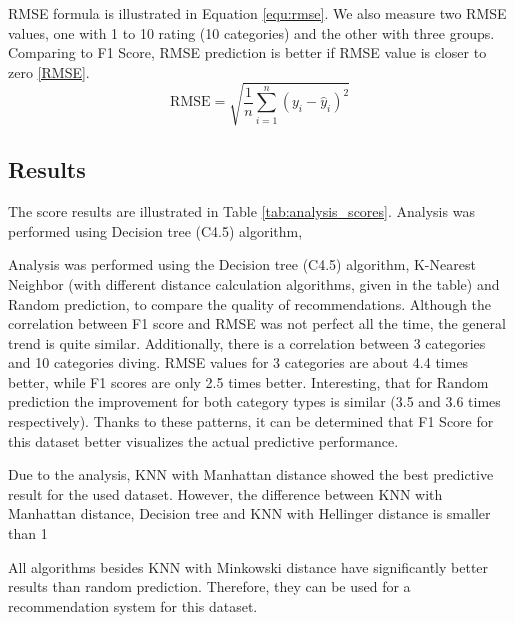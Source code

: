 RMSE formula is illustrated in Equation \eqref{equ:rmse}. We also measure two RMSE values, one with 1 to 10 rating (10 categories) and the other with three groups. Comparing to F1 Score, RMSE prediction is better if RMSE value is closer to zero \ref{RMSE}.
\begin{equation}
    \text{RMSE} = \sqrt{\frac{1}{n} \sum_{i=1}^n (y_i - \hat{y}_i)^2}\label{equ:rmse}
\end{equation}
\subsection{Results} %
The score results are illustrated in Table \ref{tab:analysis_scores}. Analysis was performed using Decision tree (C4.5) algorithm, 

Analysis was performed using the Decision tree (C4.5) algorithm, K-Nearest Neighbor (with different distance calculation algorithms, given in the table) and Random prediction, to compare the quality of recommendations. Although the correlation between F1 score and RMSE was not perfect all the time, the general trend is quite similar. Additionally, there is a correlation between 3 categories and 10 categories diving. RMSE values for 3 categories are about 4.4 times better, while F1 scores are only 2.5 times better. Interesting, that for Random prediction the improvement for both category types is similar (3.5 and 3.6 times respectively). Thanks to these patterns, it can be determined that F1 Score for this dataset better visualizes the actual predictive performance.

Due to the analysis, KNN with Manhattan distance showed the best predictive result for the used dataset. However, the difference between KNN with Manhattan distance, Decision tree and KNN with Hellinger distance is smaller than 1%

All algorithms besides KNN with Minkowski distance have significantly better results than random prediction. Therefore, they can be used for a recommendation system for this dataset.



